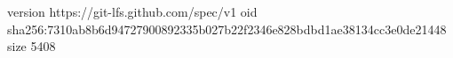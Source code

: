 version https://git-lfs.github.com/spec/v1
oid sha256:7310ab8b6d94727900892335b027b22f2346e828bdbd1ae38134cc3e0de21448
size 5408
